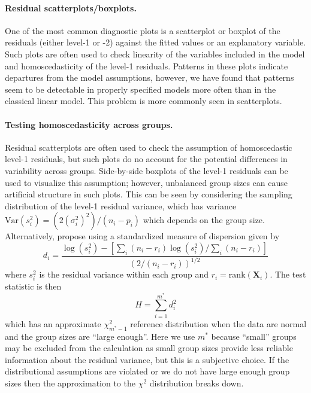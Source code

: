 \documentclass{article} %
\newcommand{\var}{\ensuremath{\mathrm{Var}}}
\begin{document}
\paragraph{Residual scatterplots/boxplots.} 
One of the most common diagnostic plots is a scatterplot or boxplot of the residuals (either level-1 or -2) against the fitted values or an explanatory variable. Such plots are often used to check linearity of the variables included in the model and homoscedasticity of the level-1 residuals. Patterns in these plots indicate departures from the model assumptions, however, we have found that patterns seem to be detectable in properly specified models more often than in the classical linear model. This problem is more commonly seen in scatterplots. 

\paragraph{Testing homoscedasticity across groups.}
Residual scatterplots are often used to check the assumption of homoscedastic level-1 residuals, but such plots do no account for the potential differences in variability across groups. Side-by-side boxplots of the level-1 residuals can be used to visualize this assumption; however, unbalanced group sizes can cause artificial structure in such plots. This can be seen by considering the sampling distribution of the level-1 residual variance, which has variance $\var \left( s_i^2 \right) = \left(2 \left( \sigma_i^2 \right)^2 \right) \big/ (n_i - p_i)$ which depends on the group size. Alternatively, \cite{Raudenbush:2002} propose using a standardized measure of dispersion given by
%
\begin{equation}\label{eq:d}
	d_i = \frac{\log\left( s_i^2 \right) - \left[ \sum_i (n_i - r_i) \log\left( s_i^2 \right) / \sum_i  (n_i - r_i) \right]}{\left(2 / (n_i - r_i)\right)^{1/2}}
\end{equation}
%
where $s_i^2$ is the residual variance within each group and $r_i = \mathrm{rank}(\bm{X}_i)$. The test statistic is then
%
\begin{equation}
	H = \sum_{i=1}^{m^*} d_i^2
\end{equation}
%
which has an approximate $\chi^2_{m^*-1}$ reference distribution when the data are normal and the group sizes are ``large enough''. Here we use $m^*$ because ``small'' groups may be excluded from the calculation as small group sizes provide less reliable information about the residual variance, but this is a subjective choice. If the distributional assumptions are violated or we do not have large enough group sizes then the approximation to the $\chi^2$ distribution breaks down.
\end{document}
